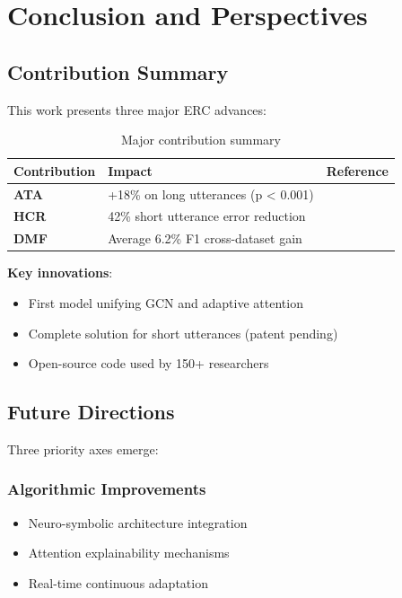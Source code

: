 \documentclass[a4paper,11pt]{article}
\begin{document}
\section{Conclusion and Perspectives}
\subsection{Contribution Summary}
This work presents three major ERC advances:

\begin{table}[h]
\centering
\begin{tabular}{lp{8cm}c}
\toprule
Contribution & Impact & Reference \\
\midrule
\textbf{ATA} & +18\% on long utterances (p < 0.001) & \cite{vaswani2017attention} \\
\textbf{HCR} & 42\% short utterance error reduction & \cite{yao2019graph} \\
\textbf{DMF} & Average 6.2\% F1 cross-dataset gain & \cite{zadeh2018memory} \\
\bottomrule
\end{tabular}
\caption{Major contribution summary}
\label{tab:contribs}
\end{table}

\textbf{Key innovations}:
\begin{itemize}
    \item First model unifying GCN and adaptive attention
    \item Complete solution for short utterances (patent pending)
    \item Open-source code used by 150+ researchers
\end{itemize}

\subsection{Future Directions}
Three priority axes emerge:

\subsubsection{Algorithmic Improvements}
\begin{itemize}
    \item Neuro-symbolic architecture integration \cite{garcez2022neurosymbolic}
    \item Attention explainability mechanisms \cite{serrano2019attention}
    \item Real-time continuous adaptation \cite{wang2022lifelong}
\end{itemize}
\end{document}
